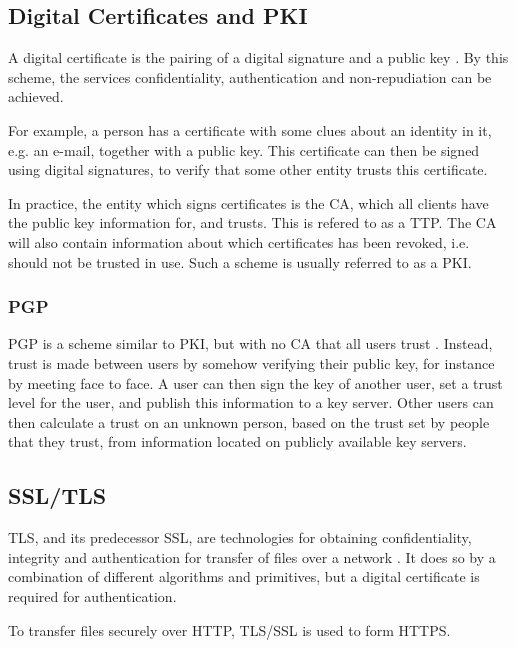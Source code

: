 \documentclass[pdftex,english,10pt,b5paper,twoside]{book}
\begin{document}
\subsection{Digital Certificates and PKI}

A digital certificate is the pairing of a digital signature and a public key
\cite{stallings}. By this scheme, the services confidentiality, authentication
and non-repudiation can be achieved.

For example, a person has a certificate with some clues about an identity in
it, e.g. an e-mail, together with a public key. This certificate can then be
signed using digital signatures, to verify that some other entity trusts this
certificate.

In practice, the entity which signs certificates is the \ac{CA}, which all
clients have the public key information for, and trusts. This is refered to as
a \ac{TTP}. The \ac{CA} will also contain information about which certificates
has been revoked, i.e. should not be trusted in use. Such a scheme is usually
referred to as a \ac{PKI}.

\subsubsection{PGP}

\ac{PGP} is a scheme similar to \ac{PKI}, but with no \ac{CA} that all users
trust \cite{stallings}. Instead, trust is made between users by somehow
verifying their public key, for instance by meeting face to face. A user can
then sign the key of another user, set a trust level for the user, and publish
this information to a key server. Other users can then calculate a trust on an
unknown person, based on the trust set by people that they trust, from
information located on publicly available key servers.

\subsection{SSL/TLS}

\ac{TLS}, and its predecessor \ac{SSL}, are technologies for obtaining
confidentiality, integrity and authentication for transfer of files over a
network \cite{stallings}. It does so by a combination of different algorithms
and primitives, but a digital certificate is required for authentication.

To transfer files securely over \ac{HTTP}, \ac{TLS}/\ac{SSL} is used to form
\ac{HTTPS}.
\end{document}
